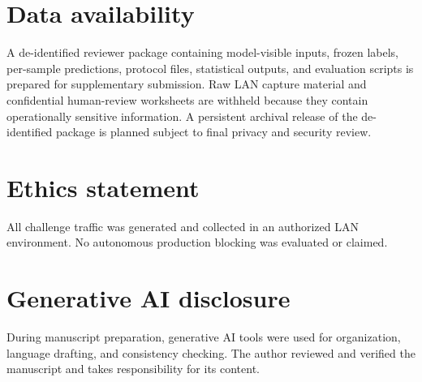 \documentclass[10pt]{article}
\begin{document}
\section*{Data availability}
A de-identified reviewer package containing model-visible inputs, frozen labels, per-sample predictions, protocol files, statistical outputs, and evaluation scripts is prepared for supplementary submission. Raw LAN capture material and confidential human-review worksheets are withheld because they contain operationally sensitive information. A persistent archival release of the de-identified package is planned subject to final privacy and security review.

\section*{Ethics statement}
All challenge traffic was generated and collected in an authorized LAN environment. No autonomous production blocking was evaluated or claimed.

\section*{Generative AI disclosure}
During manuscript preparation, generative AI tools were used for organization, language drafting, and consistency checking. The author reviewed and verified the manuscript and takes responsibility for its content.
\end{document}
